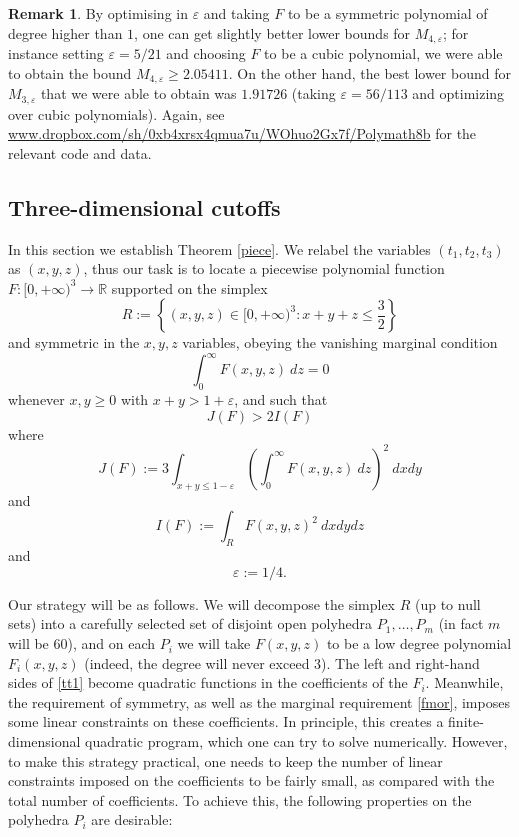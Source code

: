 \documentclass{bmcart}
\theoremstyle{plain}
\theoremstyle{definition}
\newtheorem{remark}[theorem]{Remark}
\newcommand\R{\mathbb{R}}
\newcommand\eps{\varepsilon}
\begin{document}
\begin{remark} By optimising in $\eps$ and taking $F$ to be a symmetric polynomial of degree higher than $1$, one can get slightly better lower bounds for $M_{4,\eps}$; for instance setting $\eps = 5/21$ and choosing $F$ to be a cubic polynomial, we were able to obtain the bound $M_{4,\eps} \geq 2.05411$.  On the other hand, the best lower bound for $M_{3,\eps}$ that we were able to obtain was $1.91726$ (taking $\eps = 56/113$ and optimizing over cubic polynomials).  Again, see \url{www.dropbox.com/sh/0xb4xrsx4qmua7u/WOhuo2Gx7f/Polymath8b} for the relevant code and data.
\end{remark}

\subsection{Three-dimensional cutoffs}\label{3d}

In this section we establish Theorem \ref{piece}.  We relabel the variables $(t_1,t_2,t_3)$ as $(x,y,z)$, thus our task is to locate a piecewise polynomial function
$F: [0,+\infty)^3 \to \R$ supported on the simplex
$$ R := \left\{ (x,y,z) \in [0,+\infty)^3: x+y+z \leq \frac{3}{2}\right\}$$
and symmetric in the $x,y,z$ variables, obeying the vanishing marginal condition
\begin{equation}\label{fmor}
\int_0^\infty F(x,y,z)\ dz = 0
\end{equation}
whenever $x,y \geq 0$ with $x+y > 1+\eps$, and such that
\begin{equation}\label{tt1}
J(F) > 2 I(F)
\end{equation}
where
\begin{equation}\label{jf-def}
J(F) := 3\int_{x+y \leq 1-\eps} \left(\int_0^\infty F(x,y,z)\ dz\right)^2\ dx dy
\end{equation}
and
\begin{equation}\label{if-def}
I(F) := \int_R  F(x,y,z)^2\ dx dy dz
\end{equation}
and
$$\eps := 1/4.$$

Our strategy will be as follows.  We will decompose the simplex $R$ (up to null sets) into a carefully selected set of disjoint open polyhedra $P_1,\dots,P_m$ (in fact $m$ will be $60$), and on each $P_i$ we will take $F(x,y,z)$ to be a low degree polynomial $F_i(x,y,z)$ (indeed, the degree will never exceed $3$).  The left and right-hand sides of \eqref{tt1} become quadratic functions in the coefficients of the $F_i$.  Meanwhile, the requirement of symmetry, as well as the marginal requirement \eqref{fmor}, imposes some linear constraints on these coefficients.  In principle, this creates a finite-dimensional quadratic program, which one can try to solve numerically.  However, to make this strategy practical, one needs to keep the number of linear constraints imposed on the coefficients to be fairly small, as compared with the total number of coefficients.  To achieve this, the following properties on the polyhedra $P_i$ are desirable:
\end{document}
